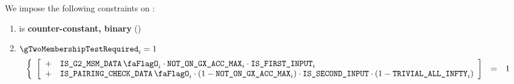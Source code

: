 \noindent
We impose the following constraints on \gTwoMembershipTestRequired{}:
\begin{enumerate}
    \item \gTwoMembershipTestRequired{} is \textbf{counter-constant, binary} \quad (\trash)
    \item \If $\gTwoMembershipTestRequired_{i} = 1$ \Then
        \[
            \left\{ \begin{array}{lcl}
                \left[ \begin{array}{cl}
                    + & \isBlsGTwoMsmData_{i} \cdot \notOnGXAccMax_{i} \cdot \isFirstInput_{i}  \\
                    + & \isBlsPairingCheckData_{i} \cdot (1 - \notOnGXAccMax_{i}) \cdot \isSecondInput \cdot (1 - \trivialAllInf_{i}) \\
                \end{array} \right] & = & 1 \\
            \end{array} \right.
        \]
\end{enumerate}


